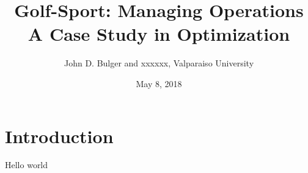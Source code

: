 \documentclass{article}
\title{Golf-Sport:  Managing Operations \\ A Case Study in Optimization}
\date{May 8, 2018}
\author{John D. Bulger and xxxxxx, Valparaiso University}
\begin{document}
	\maketitle
	\newpage
\section{Introduction}
Hello world
\end{document}
